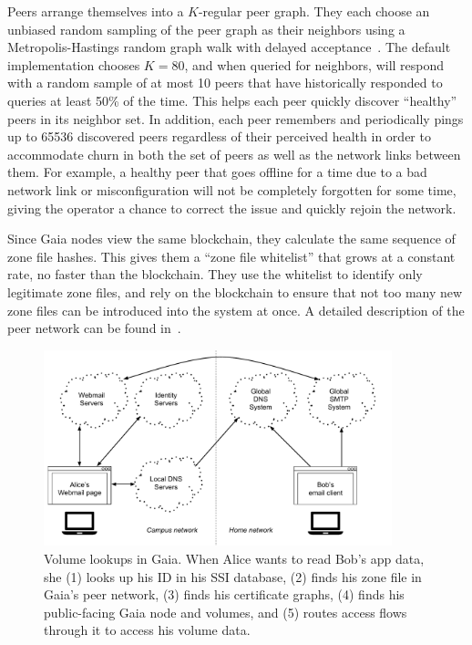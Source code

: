Peers arrange themselves into a $K$-regular peer graph.  They each choose an
unbiased random sampling of the peer graph as their neighbors using a
Metropolis-Hastings random graph walk with delayed acceptance~\cite{lee-xu-eun}.
The default implementation chooses $K=80$, and when queried for neighbors, will
respond with a random sample of at most 10 peers that
have historically responded to queries at least 50\% of the time.  This helps
each peer quickly discover ``healthy'' peers in its neighbor set.  In addition,
each peer remembers and periodically pings up to 65536 discovered
peers regardless of their perceived health in order to accommodate churn in both
the set of peers as well as the network links between them.  For example, a
healthy peer that goes offline for a time due to a bad network link or
misconfiguration will not be completely forgotten for some time, giving the
operator a chance to correct the issue and quickly rejoin the network.

Since Gaia nodes view the same blockchain, they calculate the same sequence of zone
file hashes.  This gives them a ``zone file whitelist'' that grows at a constant
rate, no faster than the blockchain.  They use the whitelist to identify only
legitimate zone files, and rely on the blockchain to ensure that not too many
new zone files can be introduced into the system at once.  A detailed
description of the peer network can be found in~\cite{ali2017}.

\begin{figure}[h]
   \centering
   \includegraphics[width=0.9\textwidth,page=18]{figures/dissertation-figures}
   \caption{Volume lookups in Gaia.  When Alice wants to read Bob's app data, she
   (1) looks up his ID in his SSI database, (2) finds his zone file in
   Gaia's peer network, (3) finds his certificate graphs, (4) finds his
   public-facing Gaia node and volumes, and (5) routes access flows through it
   to access his volume data.}
   \label{fig:chap3-gaia-volume-lookups}
\end{figure}

